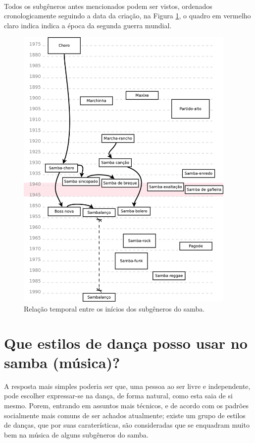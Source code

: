 ~\\

Todos os subgêneros antes mencionados podem ser vistos, ordenados cronologicamente 
seguindo a data da criação, na Figura \ref{fig:sambamusicatimeline1}, 
o quadro  em vermelho claro indica indica a época da segunda guerra mundial.
\begin{figure}[H]
  \centering
    \includegraphics[width=0.95\textwidth]{chapters/cap-historia-musicasamba/musicatimeline.eps}
  \caption{Relação temporal entre os inícios dos subgêneros do samba.}
\label{fig:sambamusicatimeline1}
\end{figure}

\section{Que estilos de dança posso usar no samba (música)?}
\label{subsec:estilosdedanca}
A resposta mais simples poderia ser que, uma pessoa ao ser livre e independente,
pode escolher expressar-se na dança, de forma natural, como esta saia de si mesmo.
Porem, entrando em assuntos mais técnicos, 
e de acordo com os padrões socialmente mais comuns de ser achados atualmente;
existe um grupo de estilos de danças, que por suas caraterísticas, 
são consideradas que se enquadram muito bem na música de alguns subgêneros do samba.

